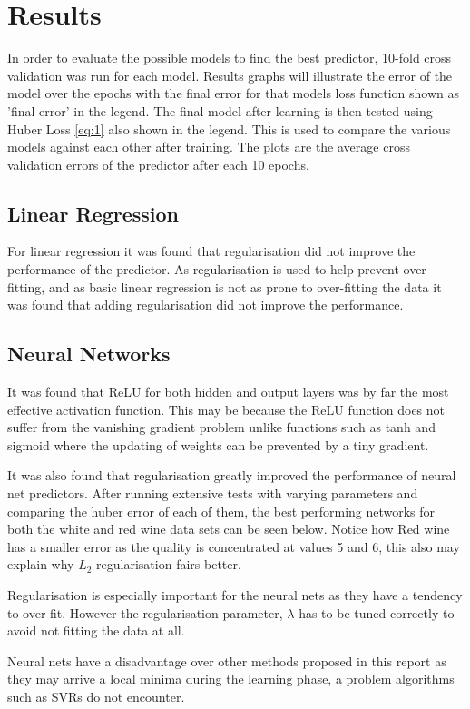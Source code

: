 \documentclass[10pt,twocolumn,letterpaper]{article}
\begin{document}
\section{Results}
In order to evaluate the possible models to find the best predictor, 10-fold cross validation was run for each model. Results graphs will illustrate the error of the model over the epochs with the final error for that models loss function shown as 'final error' in the legend. The final model after learning is then tested using Huber Loss \ref{eq:1} also shown in the legend. This is used to compare the various models against each other after training. The plots are the average cross validation errors of the predictor after each 10 epochs.

\subsection{Linear Regression}
For linear regression it was found that regularisation did not improve the performance of the predictor. As regularisation is used to help prevent over-fitting, and as basic linear regression is not as prone to over-fitting the data it was found that adding regularisation did not improve the performance.

\subsection{Neural Networks}
It was found that ReLU for both hidden and output layers was by far the most effective activation function. This may be because the ReLU function does not suffer from the vanishing gradient problem unlike functions such as tanh and sigmoid where the updating of weights can be prevented by a tiny gradient. 

It was also found that regularisation greatly improved the performance of neural net predictors. After running extensive tests with varying parameters and comparing the huber error of each of them, the best performing networks for both the white and red wine data sets can be seen below. Notice how Red wine has a smaller error as the quality is concentrated at values 5 and 6, this also may explain why $L_2$ regularisation fairs better.

Regularisation is especially important for the neural nets as they have a tendency to over-fit. However the regularisation parameter, $\lambda$ has to be tuned correctly to avoid not fitting the data at all.

Neural nets have a disadvantage over other methods proposed in this report as they may arrive a local minima during the learning phase, a problem algorithms such as SVRs do not encounter.
\end{document}
